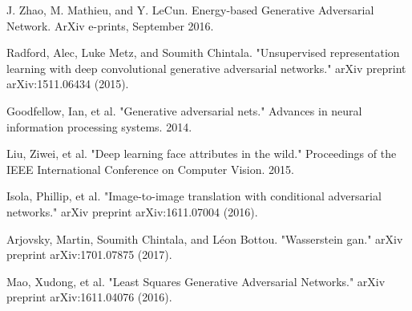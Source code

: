 \documentclass{article}
\begin{document}
\noindent [2] J. Zhao, M. Mathieu, and Y. LeCun.  Energy-based Generative Adversarial 
Network. ArXiv e-prints, September 2016.
\vspace{2pt}

\noindent [3] Radford, Alec, Luke Metz, and Soumith Chintala. "Unsupervised representation learning with deep
convolutional generative adversarial networks." arXiv preprint arXiv:1511.06434 (2015).

\noindent [4] Goodfellow, Ian, et al. "Generative adversarial nets." Advances in neural information processing systems. 2014.

\noindent [5] Liu, Ziwei, et al. "Deep learning face attributes in the wild." Proceedings of the IEEE International Conference on Computer Vision. 2015.

\noindent [6] Isola, Phillip, et al. "Image-to-image translation with conditional adversarial networks." arXiv preprint arXiv:1611.07004 (2016).

\noindent [7] Arjovsky, Martin, Soumith Chintala, and Léon Bottou. "Wasserstein gan." arXiv preprint arXiv:1701.07875 (2017).

\noindent [8] Mao, Xudong, et al. "Least Squares Generative Adversarial Networks." arXiv preprint arXiv:1611.04076 (2016).
\end{document}
